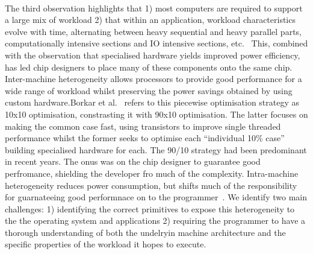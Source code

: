 \paragraph{} The third observation highlights that 1) most computers are 
required to support a large mix of workload 2) that within an application, workload characteristics evolve with time, alternating between heavy sequential and heavy parallel parts, computationally intensive sections and IO intensive sections, etc.~\cite{balakrishnan2005impactperfasym} This, combined with the observation that specialised hardware yields improved power efficiency, has led chip designers to place many of these components onto the same chip. Inter-machine heterogeneity allows processors to provide good performance for a wide range of workload whilst preserving the power savings obtained by using custom hardware.Borkar et al.~\cite{borkar2011future} refers to this piecewise
optimisation strategy as 10x10 optimisation, constrasting it with 90x10 optimisation. The latter focuses on making the common case fast, using transistors to improve single threaded performance whilst the former
seeks to optimise each ``individual 10\% case'' building specialised hardware for each. The 90/10 strategy had been predominant in recent years. The onus was on the chip designer to guarantee good perfromance, shielding the developer fro much of the complexity. Intra-machine heterogeneity reduces power consumption, but shifts much of the responsibility for guarnateeing good performnace on to the programmer~\cite{Schupbach08embracingdiversity}. We identify two main challenges: 1) identifying the correct primitives to expose this heterogeneity to the the operating system and applications 2) requiring the programmer to have a thorough understanding of both the undelryin machine architecture and the specific properties of the workload it hopes to execute.  

